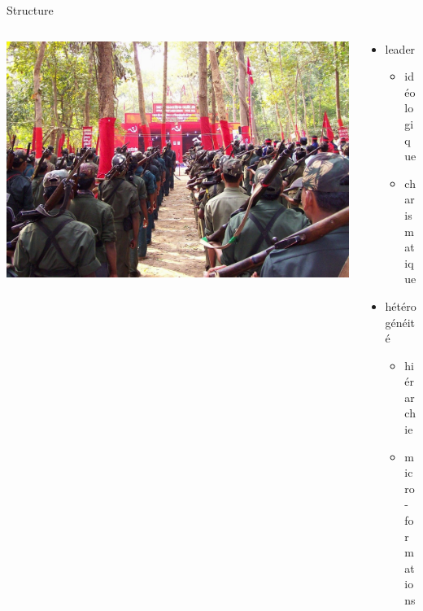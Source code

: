 \documentclass[utf8,hyperref={pagebackref}]{beamer}
\begin{document}
\begin{frame}{Structure}
\begin{columns}[c]
	\begin{column}[c]{0.6\linewidth}
		\begin{centering}
		\includegraphics[width=\linewidth]{../ressources/guerrilla_naxalite}
		\end{centering}
	\end{column}
	\begin{column}[c]{0.38\linewidth}
		\begin{itemize}
			\item leader
			\begin{itemize}
				\item idéologique
				\item charismatique
			\end{itemize}
		\end{itemize}
		\begin{itemize}
			\item hétérogénéité
			\begin{itemize}
				\item hiérarchie
				\item micro-formations
			\end{itemize}
		\end{itemize}
	\end{column}
\end{columns}
\vfill
{}
\end{frame}
\end{document}
